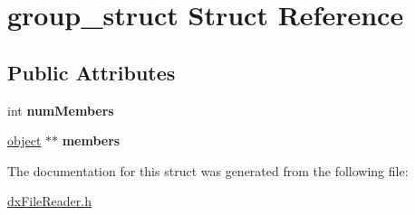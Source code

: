 \hypertarget{structgroup__struct}{
\section{group\_\-struct Struct Reference}
\label{structgroup__struct}
}
\subsection*{Public Attributes}
\begin{DoxyCompactItemize}
\item 
\hypertarget{structgroup__struct_ae30a03e4eae171792a59a4a85d99c32f}{
int {\bfseries numMembers}}
\label{structgroup__struct_ae30a03e4eae171792a59a4a85d99c32f}

\item 
\hypertarget{structgroup__struct_a668176a9e1b0318206324a81fdf88ece}{
\hyperlink{structobject__struct}{object} $\ast$$\ast$ {\bfseries members}}
\label{structgroup__struct_a668176a9e1b0318206324a81fdf88ece}

\end{DoxyCompactItemize}


The documentation for this struct was generated from the following file:\begin{DoxyCompactItemize}
\item 
\hyperlink{dxFileReader_8h}{dxFileReader.h}\end{DoxyCompactItemize}
